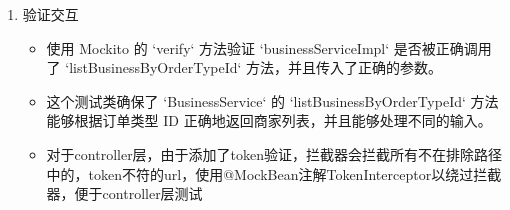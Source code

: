 \begin{enumerate}
\item  验证交互


\begin{itemize}
    \item 使用 Mockito 的 `verify` 方法验证 `businessServiceImpl` 是否被正确调用了 `listBusinessByOrderTypeId` 方法，并且传入了正确的参数。

    \item 这个测试类确保了 `BusinessService` 的 `listBusinessByOrderTypeId` 方法能够根据订单类型 ID 正确地返回商家列表，并且能够处理不同的输入。
    \item 对于controller层，由于添加了token验证，拦截器会拦截所有不在排除路径中的，token不符的url，使用@MockBean注解TokenInterceptor以绕过拦截器，便于controller层测试
\end{itemize}

\end{enumerate}



